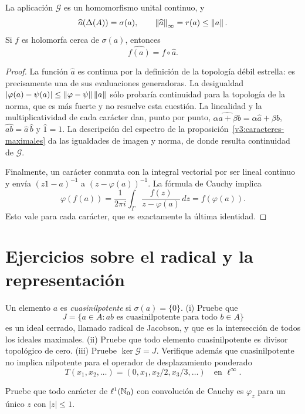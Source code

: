 \begin{teorema}\label{v3:transformada-gelfand}
La aplicación $\mathcal G$ es un homomorfismo unital continuo, y
\[
 \widehat a(\Delta(A))=\sigma(a),\qquad
 \left\lVert\widehat a\right\rVert_\infty=r(a)\le\left\lVert a\right\rVert.
\]
Si $f$ es holomorfa cerca de $\sigma(a)$, entonces
\[
 \widehat{f(a)}=f\circ\widehat a.
\]
\end{teorema}
\begin{proof}
La función $\widehat a$ es continua por la definición de la topología débil estrella: es precisamente una de sus evaluaciones generadoras. La desigualdad $|\varphi(a)-\psi(a)|\le\left\lVert\varphi-\psi\right\rVert\left\lVert a\right\rVert$ sólo probaría continuidad para la topología de la norma, que es más fuerte y no resuelve esta cuestión. La linealidad y la multiplicatividad de cada carácter dan, punto por punto,
$\widehat{\alpha a+\beta b}=\alpha\widehat a+\beta\widehat b$, $\widehat{ab}=\widehat a\,\widehat b$ y $\widehat1=1$. La descripción del espectro de la proposición~\ref{v3:caracteres-maximales} da las igualdades de imagen y norma, de donde resulta continuidad de $\mathcal G$.

Finalmente, un carácter conmuta con la integral vectorial por ser lineal continuo y envía $(z1-a)^{-1}$ a $(z-\varphi(a))^{-1}$. La fórmula de Cauchy implica
\[
 \varphi(f(a))=\frac1{2\pi i}\int_\Gamma
 \frac{f(z)}{z-\varphi(a)}\,dz=f(\varphi(a)).
\]
Esto vale para cada carácter, que es exactamente la última identidad.
\end{proof}

\section{Ejercicios sobre el radical y la representación}

\begin{ejercicio}\label{ej:v3-l24-1}
Un elemento $a$ es \emph{cuasinilpotente} si $\sigma(a)=\{0\}$. (i) Pruebe que
\[
 J=\{a\in A:ab\text{ es cuasinilpotente para todo }b\in A\}
\]
es un ideal cerrado, llamado radical de Jacobson, y que es la intersección de todos los ideales maximales. (ii) Pruebe que todo elemento cuasinilpotente es divisor topológico de cero. (iii) Pruebe $\ker\mathcal G=J$. Verifique además que cuasinilpotente no implica nilpotente para el operador de desplazamiento ponderado
\[
 T(x_1,x_2,\ldots)=(0,x_1,x_2/2,x_3/3,\ldots)
 \quad\text{en }\ell^\infty.
\]
\end{ejercicio}


\begin{ejercicio}\label{ej:v3-l24-2}
Pruebe que todo carácter de $\ell^1(\mathbb N_0)$ con convolución de Cauchy es $\varphi_z$ para un único $z$ con $|z|\le1$.
\end{ejercicio}


